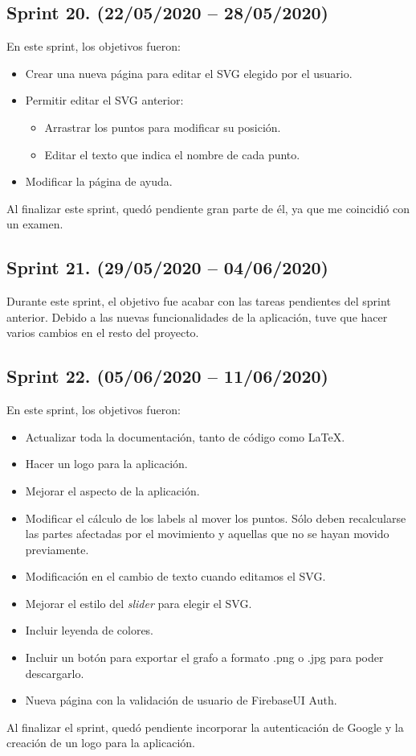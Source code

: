 \subsection{Sprint 20. (22/05/2020 -- 28/05/2020)}
En este sprint, los objetivos fueron:
\begin{itemize}
	\item Crear una nueva página para editar el SVG elegido por el usuario.
	\item Permitir editar el SVG anterior:
	\begin{itemize}
		\item Arrastrar los puntos para modificar su posición.
		\item Editar el texto que indica el nombre de cada punto.
	\end{itemize}
	\item Modificar la página de ayuda.
\end{itemize}
Al finalizar este sprint, quedó pendiente gran parte de él, ya que me coincidió con un examen.

\subsection{Sprint 21. (29/05/2020 -- 04/06/2020)}
Durante este sprint, el objetivo fue acabar con las tareas pendientes del sprint anterior. Debido a las nuevas funcionalidades de la aplicación, tuve que hacer varios cambios en el resto del proyecto.

\subsection{Sprint 22. (05/06/2020 -- 11/06/2020)}
En este sprint, los objetivos fueron:
\begin{itemize}
	\item Actualizar toda la documentación, tanto de código como \LaTeX.
	\item Hacer un logo para la aplicación.
	\item Mejorar el aspecto de la aplicación.
	\item Modificar el cálculo de los labels al mover los puntos. Sólo deben recalcularse las partes afectadas por el movimiento y aquellas que no se hayan movido previamente.
	\item Modificación en el cambio de texto cuando editamos el SVG.
	\item Mejorar el estilo del \emph{slider} para elegir el SVG.
	\item Incluir leyenda de colores.
	\item Incluir un botón para exportar el grafo a formato .png o .jpg para poder descargarlo.
	\item Nueva página con la validación de usuario de FirebaseUI Auth.
\end{itemize}
Al finalizar el sprint, quedó pendiente incorporar la autenticación de Google y la creación de un logo para la aplicación.

